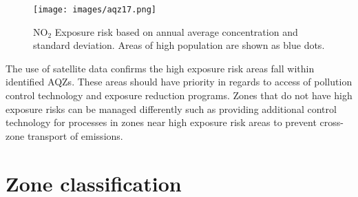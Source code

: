 %
\begin{figure}
\texttt{[image: images/aqz17.png]} 
\caption[NO$_{2}$ Exposure risk areas]{NO$_{2}$ Exposure risk based on annual average concentration and standard deviation. Areas of high population are shown as blue dots.}
\label{fig:176riskNO2}
\end{figure}
%

The use of satellite data confirms the high exposure risk areas fall within identified AQZs.  These areas should have priority in regards to access of pollution control technology and exposure reduction programs.  Zones that do not have high exposure risks can be managed differently such as providing additional control technology for processes in zones near high exposure risk areas to prevent cross-zone transport of emissions. 
\clearpage
\section{Zone classification}

